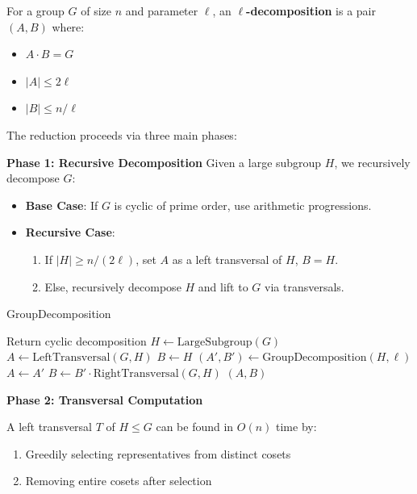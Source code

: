 \documentclass[sigconf]{acmart}
\begin{document}
\begin{definition}
For a group $G$ of size $n$ and parameter $\ell$, an \textbf{$\ell$-decomposition} is a pair $(A,B)$ where:
\begin{itemize}
    \item $A \cdot B = G$
    \item $|A| \leq 2\ell$
    \item $|B| \leq n/\ell$
\end{itemize}
\end{definition}

The reduction proceeds via three main phases:

\textbf{Phase 1: Recursive Decomposition}
Given a large subgroup $H$, we recursively decompose $G$:
\begin{itemize}
    \item \textbf{Base Case}: If $G$ is cyclic of prime order, use arithmetic progressions.
    \item \textbf{Recursive Case}:
    \begin{enumerate}
        \item If $|H| \geq n/(2\ell)$, set $A$ as a left transversal of $H$, $B = H$.
        \item Else, recursively decompose $H$ and lift to $G$ via transversals.
    \end{enumerate}
\end{itemize}

\begin{algorithm}[H]
\caption{GroupDecomposition}
\begin{algorithmic}[1]
    \STATE Return cyclic decomposition
\ELSE
    \STATE $H \gets \text{LargeSubgroup}(G)$
        \STATE $A \gets \text{LeftTransversal}(G,H)$
        \STATE $B \gets H$
    \ELSE
        \STATE $(A',B') \gets \text{GroupDecomposition}(H,\ell)$
        \STATE $A \gets A'$
        \STATE $B \gets B' \cdot \text{RightTransversal}(G,H)$
    \ENDIF
\ENDIF
\RETURN $(A,B)$
\end{algorithmic}
\end{algorithm}

\textbf{Phase 2: Transversal Computation}
\begin{lemma}
A left transversal $T$ of $H \leq G$ can be found in $O(n)$ time by:
\begin{enumerate}
    \item Greedily selecting representatives from distinct cosets
    \item Removing entire cosets after selection
\end{enumerate}
\end{lemma}
\end{document}
